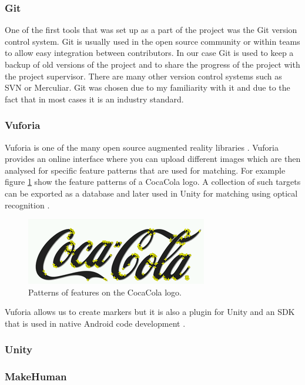 \documentclass{l4proj}
\begin{document}
\subsubsection{Git}
One of the first tools that was set up as a part of the project was the Git version control system. Git is usually used in the open source community or within teams to allow easy integration between contributors. In our case Git is used to keep a backup of old versions of the project and to share the progress of the project with the project supervisor. There are many other version control systems such as SVN or Merculiar. Git was chosen due to my familiarity with it and due to the fact that in most cases it is an industry standard.
	
\subsubsection{Vuforia}
Vuforia is one of the many open source augmented reality libraries \cite{vuforia}. Vuforia provides an online interface where you can upload different images which are then analysed for specific feature patterns that are used for matching. For example figure \ref{fig:coca_cola_features} show the feature patterns of a CocaCola logo. A collection of such targets can be exported as a database and later used in Unity for matching using optical recognition \cite{vuforia_unity}.
\begin{figure}
\centering
\includegraphics[scale=1]{images/coca_cola_features.png}
\caption{Patterns of features on the CocaCola logo.}
\label{fig:coca_cola_features}
\end{figure}

Vuforia allows us to create markers but it is also a plugin for Unity and an SDK that is used in native Android code development \cite{vuforia_unity}.

\subsubsection{Unity}


\subsubsection{MakeHuman}
\end{document}
